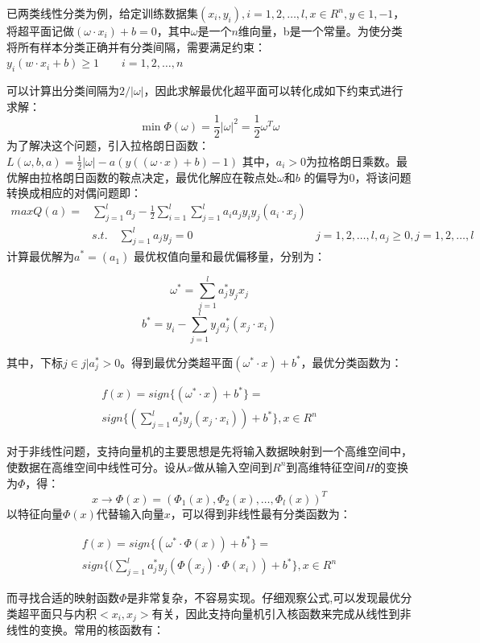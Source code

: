 \documentclass{article}
\begin{document}
已两类线性分类为例，给定训练数据集\((x_{i},y_{i}),i=1,2,\ldots,l,x\in R^{n},y\in{1,-1}\)，将超平面记做\((\omega\cdot x_{i})+b=0\)，其中\(\omega\)是一个\(n\)维向量，b是一个常量。为使分类将所有样本分类正确并有分类间隔，需要满足约束：\(y_{i}(w\cdot x_{i}+b)\ge 1\quad\quad i = 1,2,\ldots,n\)

可以计算出分类间隔为\(2/\lvert \omega \rvert\)，因此求解最优化超平面可以转化成如下约束式进行求解：
\[\min\Phi(\omega) = \frac{1}{2}\lvert \omega \rvert^{2} = \frac{1}{2}\omega^T\omega\]
为了解决这个问题，引入拉格朗日函数：
\(L(\omega,b,a)=\frac{1}{2}\lvert\omega\rvert-a(y((\omega\cdot x) + b)-1)\)
其中，\(a_{i}>0\)为拉格朗日乘数。最优解由拉格朗日函数的鞍点决定，最优化解应在鞍点处\(\omega\)和\(b\)
的偏导为0，将该问题转换成相应的对偶问题即： \[
\begin{array}{lll}
maxQ(a) = &\sum_{j=1}^{l}a_{j}-\frac{1}{2}\sum_{i=1}^{l}\sum_{j=1}^{l}a_{i}a_{j}y_{i}y_{j}(a_{i}\cdot x_{j}) & \\
& s.t.\quad \sum_{j=1}^{l}a_{j}y_{j}=0 & j=1,2,\ldots,l,a_{j}\ge0,j=1,2,\ldots,l
\end{array}\] 计算最优解为\(a^{*}=(a_{1}^{})\)
最优权值向量和最优偏移量，分别为：

\[\omega^{*} = \sum_{j=1}^{l}a_{j}^*y_{j}x_{j}\]
\[b^{*} = y_{i}-\sum_{j=1}^{l}y_{j}a_{j}^*(x_{j}\cdot x_{i})\]

其中，下标\(j\in{j|a_{j}^{*}>0}\)。得到最优分类超平面\((\omega^*\cdot x) + b^*\)，最优分类函数为：

\[
\begin{array}{ll}
f(x)=sign\{(\omega^{*}\cdot x)+b^*\}=\\
sign\{(\sum_{j=1}^{l}a_{j}^{*}y_{j}(x_{j}\cdot x_{i}))+b^*\},x\in R^{n}
\end{array}
\]

对于非线性问题，支持向量机的主要思想是先将输入数据映射到一个高维空间中，使数据在高维空间中线性可分。设从\(x\)做从输入空间到\(R^{n}\)到高维特征空间\(H\)的变换为\(\Phi\)，得：
\[x\to\Phi(x)=(\Phi_{1}(x),\Phi_{2}(x),\ldots,\Phi_{l}(x))^{T}\]
以特征向量\(\Phi(x)\)代替输入向量\(x\)，可以得到非线性最有分类函数为：

\[
\begin{array}{ll}
f(x)=sign\{(\omega^{*}\cdot \Phi(x))+b^*\}=\\
sign\{(\sum_{j=1}^{l}a_{j}^{*}y_{j}(\Phi(x_{j})\cdot \Phi(x_{i}))+b^*\},x\in R^{n}
\end{array}
\]

而寻找合适的映射函数\(\Phi\)是非常复杂，不容易实现。仔细观察公式,可以发现最优分类超平面只与内积\(< x_{i},x_{j}>\)有关，因此支持向量机引入核函数来完成从线性到非线性的变换。常用的核函数有：
\end{document}
